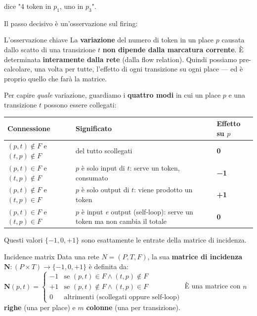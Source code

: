 dice "4 token in $p_1$, uno in $p_3$".

Il passo decisivo è un'osservazione sul firing:

\begin{boxtip}{L'osservazione chiave}
La \textbf{variazione} del numero di token in un place $p$ causata dallo scatto di una transizione $t$ \textbf{non dipende dalla marcatura corrente}. È determinata \textbf{interamente dalla rete} (dalla flow relation). Quindi possiamo pre-calcolare, una volta per tutte, l'effetto di ogni transizione su ogni place — ed è proprio quello che farà la matrice.
\end{boxtip}

Per capire \emph{quale} variazione, guardiamo i \textbf{quattro modi} in cui un place $p$ e una transizione $t$ possono essere collegati:

\begingroup\small
\begin{tabularx}{\linewidth}{>{\raggedright\arraybackslash}X>{\raggedright\arraybackslash}X>{\raggedright\arraybackslash}X}
\toprule
\textbf{Connessione} & \textbf{Significato} & \textbf{Effetto su $p$} \\
\midrule
$(p,t) \notin F$ e $(t,p) \notin F$ & del tutto scollegati & \textbf{0} \\
$(p,t) \in F$ e $(t,p) \notin F$ & $p$ è solo input di $t$: serve un token, consumato & \textbf{−1} \\
$(p,t) \notin F$ e $(t,p) \in F$ & $p$ è solo output di $t$: viene prodotto un token & \textbf{+1} \\
$(p,t) \in F$ e $(t,p) \in F$ & $p$ è input \emph{e} output (self-loop): serve un token ma non cambia il totale & \textbf{0} \\
\bottomrule
\end{tabularx}
\endgroup

Questi valori $\{-1, 0, +1\}$ sono esattamente le entrate della matrice di incidenza.

\begin{boxdefinition}{Incidence matrix}
Data una rete $N = (P, T, F)$, la sua \textbf{matrice di incidenza} $\mathbf{N} : (P \times T) \to \{-1, 0, +1\}$ è definita da: \(\mathbf{N}(p, t) = \begin{cases} -1 & \text{se } (p,t) \in F \wedge (t,p) \notin F \\ +1 & \text{se } (p,t) \notin F \wedge (t,p) \in F \\ 0 & \text{altrimenti (scollegati oppure self-loop)} \end{cases}\) È una matrice con $n$ \textbf{righe} (una per place) e $m$ \textbf{colonne} (una per transizione).
\end{boxdefinition}

